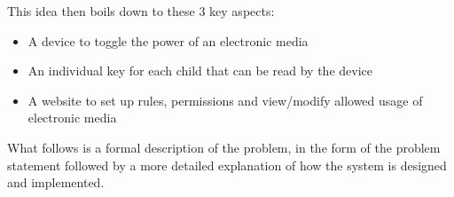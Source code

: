 This idea then boils down to these 3 key aspects:

\begin{itemize}
	\item A device to toggle the power of an electronic media
	\item An individual key for each child that can be read by the device
	\item A website to set up rules, permissions and view/modify allowed usage of electronic media
\end{itemize} 

What follows is a formal description of the problem, in the form of the problem statement followed by a more detailed explanation of how the system is designed and implemented.
